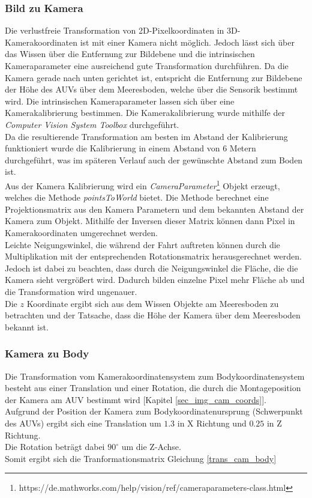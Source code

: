 \subsubsection{Bild zu Kamera}
\label{section_PicToCam}
Die verlustfreie Transformation von 2D-Pixelkoordinaten in 3D-Kamerakoordinaten ist mit einer Kamera nicht möglich. Jedoch lässt sich über das Wissen über die Entfernung zur Bildebene und die intrinsischen Kameraparameter eine ausreichend gute Transformation durchführen. Da die Kamera gerade nach unten gerichtet ist, entspricht die Entfernung zur Bildebene der Höhe des AUVs über dem Meeresboden, welche über die Sensorik bestimmt wird. Die intrinsischen Kameraparameter lassen sich über eine Kamerakalibrierung bestimmen. Die Kamerakalibrierung wurde mithilfe der \matlab \textit{Computer Vision System Toolbox} durchgeführt.\\
Da die resultierende Transformation am besten im Abstand der Kalibrierung funktioniert wurde die Kalibrierung in einem Abstand von 6 Metern durchgeführt, was im späteren Verlauf auch der gewünschte Abstand zum Boden ist.\\
Aus der Kamera Kalibrierung wird ein \textit{CameraParameter}\footnote{https://de.mathworks.com/help/vision/ref/cameraparameters-class.html} Objekt erzeugt, welches die Methode \textit{pointsToWorld} bietet. Die Methode berechnet eine Projektionsmatrix aus den Kamera Parametern und dem bekannten Abstand der Kamera zum Objekt. Mithilfe der Inversen dieser Matrix können dann Pixel in Kamerakoordinaten umgerechnet werden.\\
Leichte Neigungswinkel, die während der Fahrt auftreten können durch die Multiplikation mit der entsprechenden Rotationsmatrix herausgerechnet werden. Jedoch ist dabei zu beachten, dass durch die Neigungswinkel die Fläche, die die Kamera sieht vergrößert wird. Dadurch bilden einzelne Pixel mehr Fläche ab und die Transformation wird ungenauer.\\
Die $z$ Koordinate ergibt sich aus dem Wissen Objekte am Meeresboden zu betrachten und der Tatsache, dass die Höhe der Kamera über dem Meeresboden bekannt ist.

\subsubsection{Kamera zu Body}
Die Transformation vom Kamerakoordinatensystem zum Bodykoordinatensystem besteht aus einer Translation und einer Rotation, die durch die Montageposition der Kamera am AUV bestimmt wird [Kapitel \ref{sec_img_cam_coords}].\\
Aufgrund der Position der Kamera zum Bodykoordinatenursprung (Schwerpunkt des AUVs) ergibt sich eine Translation um $1.3$ in X Richtung und $0.25$ in Z Richtung.\\
Die Rotation beträgt dabei $90^\circ$ um die Z-Achse.\\
Somit ergibt sich die Tranformationsmatrix Gleichung \ref{trans_cam_body}\\

